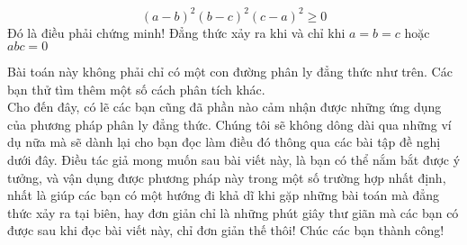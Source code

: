 \begin{bt}
{\begin{displaymath}
\left(a-b\right)^2\left(b-c\right)^2\left(c-a\right)^2\geq 0
\end{displaymath}
Đó là điều phải chứng minh! Đẳng thức xảy ra khi và chỉ khi $a=b=c$ hoặc $abc=0$
\begin{nx}
Bài toán này không phải chỉ có một con đường phân ly đẳng thức như trên. Các bạn thử tìm thêm một số cách phân tích khác.\\
Cho đến đây, có lẽ các bạn cũng đã phần nào cảm nhận được những ứng dụng của phương pháp phân ly đẳng thức. Chúng tôi sẽ không dông dài qua những ví dụ nữa mà sẽ dành lại cho bạn đọc làm điều đó thông qua các bài tập đề nghị dưới đây. Điều tác giả mong muốn sau bài viết này, là bạn có thể nắm bắt được ý tưởng, và vận dụng được phương pháp này trong một số trường hợp nhất định, nhất là giúp các bạn có một hướng đi khả dĩ khi gặp những bài toán mà đẳng thức xảy ra tại biên, hay đơn giản chỉ là những phút giây thư giãn mà các bạn có được sau khi đọc bài viết này, chỉ đơn giản thế thôi! Chúc các bạn thành công!
\end{nx}
}
\end{bt}

